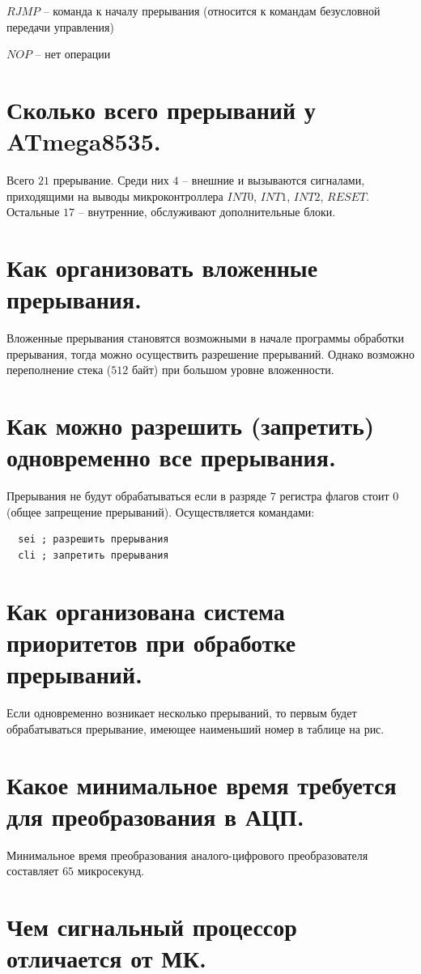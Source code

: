 $RJMP$ -- команда к началу прерывания (относится к командам безусловной передачи управления)

$NOP$ -- нет операции



\section{Сколько всего прерываний у ATmega8535.}
Всего $21$ прерывание. Среди них $4$ -- внешние 
и вызываются сигналами, приходящими на выводы микроконтроллера
$INT0$, $INT1$, $INT2$, $RESET$. Остальные $17$ -- внутренние, обслуживают
дополнительные блоки.


\section{Как организовать вложенные прерывания.}
Вложенные прерывания становятся возможными в начале программы обработки
прерывания, тогда можно осуществить разрешение прерываний. Однако 
возможно переполнение стека ($512$ байт) при большом уровне вложенности.


\section{Как можно разрешить (запретить) одновременно все прерывания.}
Прерывания не будут обрабатываться если в разряде $7$ регистра флагов 
стоит $0$ (общее запрещение прерываний). Осуществляется командами:
\begin{verbatim}
  sei ; разрешить прерывания
  cli ; запретить прерывания
\end{verbatim}

\section{Как организована система приоритетов при обработке прерываний. }
Если одновременно возникает несколько прерываний, то первым будет 
обрабатываться прерывание, имеющее наименьший номер в таблице на рис. 

\section{Какое минимальное время требуется для преобразования в АЦП.}
Минимальное время преобразования аналого-цифрового преобразователя 
составляет $65$ микросекунд.

\section{Чем сигнальный процессор отличается от МК.}

